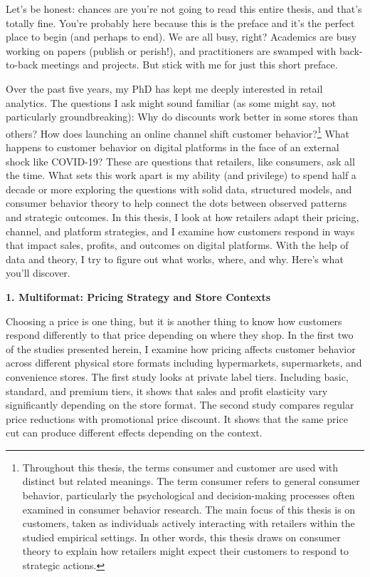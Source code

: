 
Let’s be honest: chances are you’re not going to read this entire thesis, and that’s totally fine. You’re probably here because this is the preface and it’s the perfect place to begin (and perhaps to end). We are all busy, right? Academics are busy working on papers (publish or perish!), and practitioners are swamped with back-to-back meetings and projects. But stick with me for just this short preface.

Over the past five years, my PhD has kept me deeply interested in retail analytics. The questions I ask might sound familiar (as some might say, not particularly groundbreaking): Why do discounts work better in some stores than others? How does launching an online channel shift customer behavior?\footnote{Throughout this thesis, the terms consumer and customer are used with distinct but related meanings. The term consumer refers to general consumer behavior, particularly the psychological and decision-making processes often examined in consumer behavior research. The main focus of this thesis is on customers, taken as individuals actively interacting with retailers within the studied empirical settings. In other words, this thesis draws on consumer theory to explain how retailers might expect their customers to respond to strategic actions.} What happens to customer behavior on digital platforms in the face of an external shock like COVID-19? These are questions that retailers, like consumers, ask all the time. What sets this work apart is my ability (and privilege) to spend half a decade or more exploring the questions with solid data, structured models, and consumer behavior theory to help connect the dots between observed patterns and strategic outcomes.
In this thesis, I look at how retailers adapt their pricing, channel, and platform strategies, and I examine how customers respond in ways that impact sales, profits, and outcomes on digital platforms. With the help of data and theory, I try to figure out what works, where, and why.
Here’s what you’ll discover.


\textbf{1. Multiformat: Pricing Strategy and Store Contexts}

Choosing a price is one thing, but it is another thing to know how customers respond differently to that price depending on where they shop. In the first two of the studies presented herein, I examine how pricing affects customer behavior across different physical store formats including hypermarkets, supermarkets, and convenience stores. The first study looks at private label tiers. Including basic, standard, and premium tiers, it shows that sales and profit elasticity vary significantly depending on the store format. The second study compares regular price reductions with promotional price discount. It shows that the same price cut can produce different effects depending on the context.

